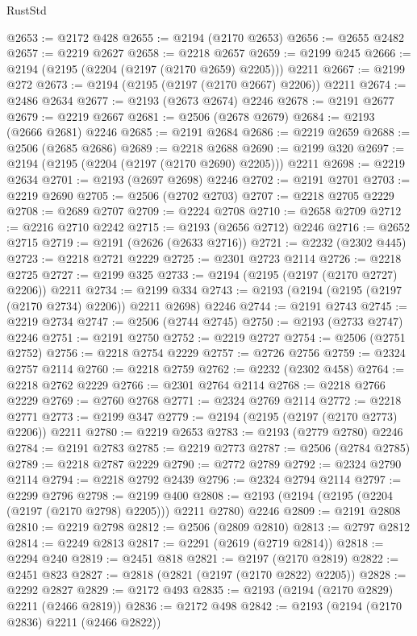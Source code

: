 \begin{lexlean}{RustStd}
\begin{coremodule}
{\begin{coremodule}
{{{{{{{{{{{{{{{{{{{{{{{{{{@2653 := @2172 @428
@2655 := @2194 (@2170 @2653)
@2656 := @2655 @2482
@2657 := @2219 @2627
@2658 := @2218 @2657
@2659 := @2199 @245
@2666 := @2194 (@2195 (@2204 (@2197 (@2170 @2659) @2205))) @2211
@2667 := @2199 @272
@2673 := @2194 (@2195 (@2197 (@2170 @2667) @2206)) @2211
@2674 := @2486 @2634
@2677 := @2193 (@2673 @2674) @2246
@2678 := @2191 @2677
@2679 := @2219 @2667
@2681 := @2506 (@2678 @2679)
@2684 := @2193 (@2666 @2681) @2246
@2685 := @2191 @2684
@2686 := @2219 @2659
@2688 := @2506 (@2685 @2686)
@2689 := @2218 @2688
@2690 := @2199 @320
@2697 := @2194 (@2195 (@2204 (@2197 (@2170 @2690) @2205))) @2211
@2698 := @2219 @2634
@2701 := @2193 (@2697 @2698) @2246
@2702 := @2191 @2701
@2703 := @2219 @2690
@2705 := @2506 (@2702 @2703)
@2707 := @2218 @2705 @2229
@2708 := @2689 @2707
@2709 := @2224 @2708
@2710 := @2658 @2709
@2712 := @2216 @2710 @2242
@2715 := @2193 (@2656 @2712) @2246
@2716 := @2652 @2715
@2719 := @2191 (@2626 (@2633 @2716))
@2721 := @2232 (@2302 @445)
@2723 := @2218 @2721 @2229
@2725 := @2301 @2723 @2114
@2726 := @2218 @2725
@2727 := @2199 @325
@2733 := @2194 (@2195 (@2197 (@2170 @2727) @2206)) @2211
@2734 := @2199 @334
@2743 := @2193 (@2194 (@2195 (@2197 (@2170 @2734) @2206)) @2211 @2698) @2246
@2744 := @2191 @2743
@2745 := @2219 @2734
@2747 := @2506 (@2744 @2745)
@2750 := @2193 (@2733 @2747) @2246
@2751 := @2191 @2750
@2752 := @2219 @2727
@2754 := @2506 (@2751 @2752)
@2756 := @2218 @2754 @2229
@2757 := @2726 @2756
@2759 := @2324 @2757 @2114
@2760 := @2218 @2759
@2762 := @2232 (@2302 @458)
@2764 := @2218 @2762 @2229
@2766 := @2301 @2764 @2114
@2768 := @2218 @2766 @2229
@2769 := @2760 @2768
@2771 := @2324 @2769 @2114
@2772 := @2218 @2771
@2773 := @2199 @347
@2779 := @2194 (@2195 (@2197 (@2170 @2773) @2206)) @2211
@2780 := @2219 @2653
@2783 := @2193 (@2779 @2780) @2246
@2784 := @2191 @2783
@2785 := @2219 @2773
@2787 := @2506 (@2784 @2785)
@2789 := @2218 @2787 @2229
@2790 := @2772 @2789
@2792 := @2324 @2790 @2114
@2794 := @2218 @2792 @2439
@2796 := @2324 @2794 @2114
@2797 := @2299 @2796
@2798 := @2199 @400
@2808 := @2193 (@2194 (@2195 (@2204 (@2197 (@2170 @2798) @2205))) @2211 @2780) @2246
@2809 := @2191 @2808
@2810 := @2219 @2798
@2812 := @2506 (@2809 @2810)
@2813 := @2797 @2812
@2814 := @2249 @2813
@2817 := @2291 (@2619 (@2719 @2814))
@2818 := @2294 @240
@2819 := @2451 @818
@2821 := @2197 (@2170 @2819)
@2822 := @2451 @823
@2827 := @2818 (@2821 (@2197 (@2170 @2822) @2205))
@2828 := @2292 @2827
@2829 := @2172 @493
@2835 := @2193 (@2194 (@2170 @2829) @2211 (@2466 @2819))
@2836 := @2172 @498
@2842 := @2193 (@2194 (@2170 @2836) @2211 (@2466 @2822))
}}}}}}}}}}}}}}}}}}}}}}}}}}
\end{coremodule}}
\end{coremodule}
\end{lexlean}
